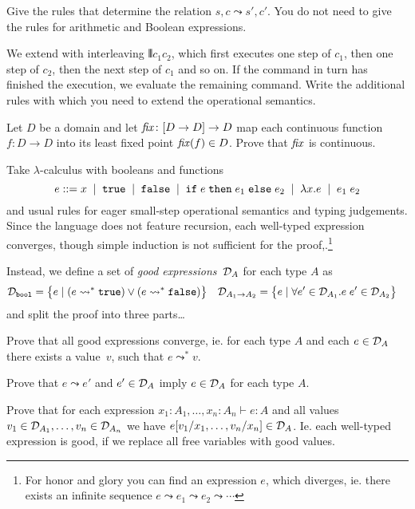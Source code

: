 \documentclass[arhiv]{../izpit}
\begin{document}
\podnaloga Give the rules that determine the relation $s, c \leadsto s', c'$. You do not need to give the rules for arithmetic and Boolean expressions.

\podnaloga We extend {\imp} with interleaving $\interleave{c_1}{c_2}$, which first executes one step of $c_1$, then one step of $c_2$, then the next step of $c_1$ and so on. If the command in turn has finished the execution, we evaluate the remaining command. Write the additional rules with which you need to extend the operational semantics.
\prostor[2]

\nadaljevanje

\naloga[\tocke{20}]
Let $D$ be a domain and let $\mathit{fix} \colon [D \to D] \to D$ map each continuous function $f \colon D \to D$ into its least fixed point $\mathit{fix}(f) \in D$. Prove that $\mathit{fix}$ is continuous.

\nadaljevanje

\naloga[\tocke{20}]
Take $\lambda$-calculus with booleans and functions
\[
  e \mathrel{{:}{:}{=}}
  x \;\mid\;
  \mathtt{true} \;\mid\;
  \mathtt{false} \;\mid\;
  \mathtt{if}\;e\;\mathtt{then}\;e_1\;\mathtt{else}\;e_2 \;\mid\;
  \lambda x. e \;\mid\;
  e_1 \; e_2
\]
and usual rules for eager small-step operational semantics and typing judgements. Since the language does not feature recursion, each well-typed expression converges, though simple induction is not sufficient for the proof,.\footnote{For honor and glory you can find an expression $e$, which diverges, ie. there exists an infinite sequence $e \leadsto e_1 \leadsto e_2 \leadsto \cdots$
}


Instead, we define a set of \emph{good expressions}~$\mathcal{D}_{A}$ for each type $A$ as
%
\begin{align*}
  \mathcal{D}_{\mathtt{bool}} &=
    \big\{ e \mid (e \leadsto^* \mathtt{true}) \lor (e \leadsto^* \mathtt{false}) \big\} &
  \mathcal{D}_{A_1 \to A_2} &=
    \big\{ e \mid \forall e' \in \mathcal{D}_{A_1}. e \; e' \in \mathcal{D}_{A_2} \big\}
\end{align*}
%
and split the proof into three parts\ldots

\podnaloga
Prove that all good expressions converge, ie. for each type $A$ and each $e \in \mathcal{D}_{A}$ there exists a value~$v$, such that $e \leadsto^* v$.

\podnaloga
Prove that $e \leadsto e'$ and $e' \in \mathcal{D}_{A}$ imply $e \in \mathcal{D}_{A}$ for each type $A$.

\podnaloga
Prove that for each expression $x_1 : A_1, \dots, x_n : A_n \vdash e : A$ and all values $v_1 \in \mathcal{D}_{A_1}, \dots, v_n \in \mathcal{D}_{A_n}$ we have $e[v_1 / x_1, \dots, v_n / x_n] \in \mathcal{D}_{A}$. Ie. each well-typed expression is good, if we replace all free variables with good values.

\nadaljevanje
\end{document}
